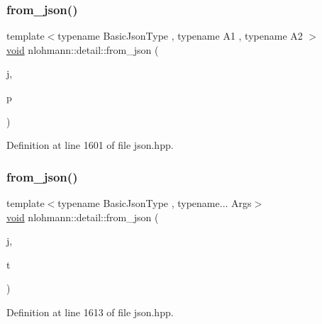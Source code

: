 \subsubsection{\texorpdfstring{from\_json()}{from\_json()}\hspace{0.1cm}{\footnotesize\ttfamily [15/18]}}
{\footnotesize\ttfamily template$<$typename Basic\+Json\+Type , typename A1 , typename A2 $>$ \\
\mbox{\hyperlink{namespacenlohmann_1_1detail_a59fca69799f6b9e366710cb9043aa77d}{void}} nlohmann\+::detail\+::from\+\_\+json (\begin{DoxyParamCaption}\item[{const Basic\+Json\+Type \&}]{j,  }\item[{std\+::pair$<$ A1, A2 $>$ \&}]{p }\end{DoxyParamCaption})}



Definition at line 1601 of file json.\+hpp.

\mbox{\label{namespacenlohmann_1_1detail_a8b99ec9b29f3f20a18fc4281fb784e49}} 
\subsubsection{\texorpdfstring{from\_json()}{from\_json()}\hspace{0.1cm}{\footnotesize\ttfamily [16/18]}}
{\footnotesize\ttfamily template$<$typename Basic\+Json\+Type , typename... Args$>$ \\
\mbox{\hyperlink{namespacenlohmann_1_1detail_a59fca69799f6b9e366710cb9043aa77d}{void}} nlohmann\+::detail\+::from\+\_\+json (\begin{DoxyParamCaption}\item[{const Basic\+Json\+Type \&}]{j,  }\item[{std\+::tuple$<$ Args... $>$ \&}]{t }\end{DoxyParamCaption})}



Definition at line 1613 of file json.\+hpp.

